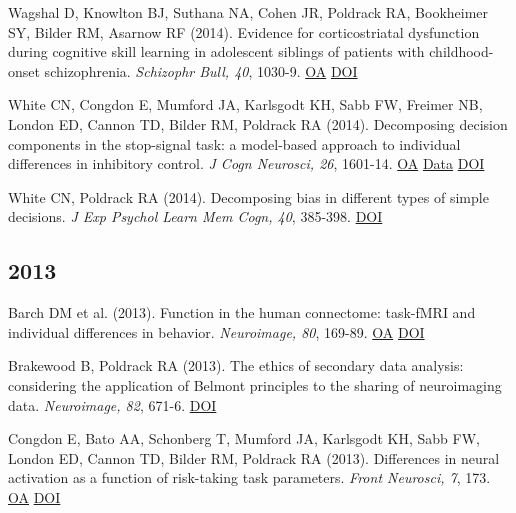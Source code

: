 Wagshal D, Knowlton BJ, Suthana NA, Cohen JR, Poldrack RA, Bookheimer SY, Bilder RM, Asarnow RF (2014). Evidence for corticostriatal dysfunction during cognitive skill learning in adolescent siblings of patients with childhood-onset schizophrenia. \textit{Schizophr Bull, 40}, 1030-9. \href{https://www.ncbi.nlm.nih.gov/pmc/articles/PMC4133665}{OA} \href{http://dx.doi.org/10.1093/schbul/sbt147}{DOI} \vspace{2mm}

White CN, Congdon E, Mumford JA, Karlsgodt KH, Sabb FW, Freimer NB, London ED, Cannon TD, Bilder RM, Poldrack RA (2014). Decomposing decision components in the stop-signal task: a model-based approach to individual differences in inhibitory control. \textit{J Cogn Neurosci, 26}, 1601-14. \href{https://www.ncbi.nlm.nih.gov/pmc/articles/PMC4119005}{OA} \href{https://openneuro.org/datasets/ds000030/versions/1.0.0}{Data} \href{http://dx.doi.org/10.1162/jocn\_a\_00567}{DOI} \vspace{2mm}

White CN, Poldrack RA (2014). Decomposing bias in different types of simple decisions. \textit{J Exp Psychol Learn Mem Cogn, 40}, 385-398. \href{http://dx.doi.org/10.1037/a0034851}{DOI} \vspace{2mm}

\subsection*{2013}

Barch DM et al. (2013). Function in the human connectome: task-fMRI and individual differences in behavior. \textit{Neuroimage, 80}, 169-89. \href{https://www.ncbi.nlm.nih.gov/pmc/articles/PMC4011498}{OA} \href{http://dx.doi.org/10.1016/j.neuroimage.2013.05.033}{DOI} \vspace{2mm}

Brakewood B, Poldrack RA (2013). The ethics of secondary data analysis: considering the application of Belmont principles to the sharing of neuroimaging data. \textit{Neuroimage, 82}, 671-6. \href{http://dx.doi.org/10.1016/j.neuroimage.2013.02.040}{DOI} \vspace{2mm}

Congdon E, Bato AA, Schonberg T, Mumford JA, Karlsgodt KH, Sabb FW, London ED, Cannon TD, Bilder RM, Poldrack RA (2013). Differences in neural activation as a function of risk-taking task parameters. \textit{Front Neurosci, 7}, 173. \href{https://www.ncbi.nlm.nih.gov/pmc/articles/PMC3786224}{OA} \href{http://dx.doi.org/10.3389/fnins.2013.00173}{DOI} \vspace{2mm}

